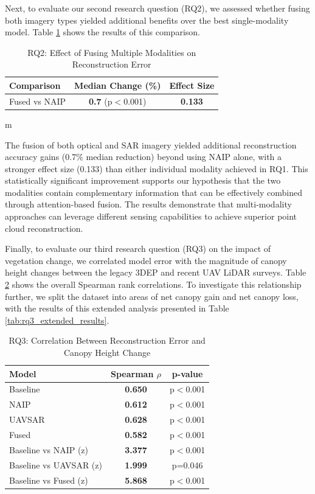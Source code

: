 \documentclass[preprints,article,accept,pdftex,moreauthors]{Definitions/mdpi}
\begin{document}
Next, to evaluate our second research question (RQ2), we assessed whether fusing both imagery types yielded additional benefits over the best single-modality model. Table \ref{tab:rq2_results} shows the results of this comparison.

\begin{table}[htbp]
\centering
\caption{RQ2: Effect of Fusing Multiple Modalities on Reconstruction Error}
\begin{tabular}{lcc}
\toprule
\textbf{Comparison} & \textbf{Median Change (\%)} & \textbf{Effect Size} \\
\midrule
Fused vs NAIP & \textbf{0.7} (p$<$0.001) & \textbf{0.133} \\
\bottomrule
\end{tabular}m
\label{tab:rq2_results}
\end{table}

The fusion of both optical and SAR imagery yielded additional reconstruction accuracy gains (0.7\% median reduction) beyond using NAIP alone, with a stronger effect size (0.133) than either individual modality achieved in RQ1. This statistically significant improvement supports our hypothesis that the two modalities contain complementary information that can be effectively combined through attention-based fusion. The results demonstrate that multi-modality approaches can leverage different sensing capabilities to achieve superior point cloud reconstruction.

Finally, to evaluate our third research question (RQ3) on the impact of vegetation change, we correlated model error with the magnitude of canopy height changes between the legacy 3DEP and recent UAV LiDAR surveys. Table \ref{tab:rq3_results} shows the overall Spearman rank correlations. To investigate this relationship further, we split the dataset into areas of net canopy gain and net canopy loss, with the results of this extended analysis presented in Table \ref{tab:rq3_extended_results}.

\begin{table}[htbp]
\centering
\caption{RQ3: Correlation Between Reconstruction Error and Canopy Height Change}
\begin{tabular}{lcc}
\toprule
\textbf{Model} & \textbf{Spearman $\rho$} & \textbf{p-value} \\
\midrule
Baseline & \textbf{0.650} & p$<$0.001 \\
NAIP & \textbf{0.612} & p$<$0.001 \\
UAVSAR & \textbf{0.628} & p$<$0.001 \\
Fused & \textbf{0.582} & p$<$0.001 \\
\midrule
Baseline vs NAIP (z) & \textbf{3.377} & p$<$0.001 \\
Baseline vs UAVSAR (z) & \textbf{1.999} & p=0.046 \\
Baseline vs Fused (z) & \textbf{5.868} & p$<$0.001 \\
\bottomrule
\end{tabular}
\label{tab:rq3_results}
\end{table}
\end{document}
